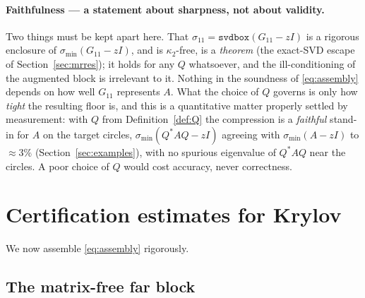 \documentclass[11pt]{article}
\newcommand{\sig}{\sigma}
\newcommand{\sigmin}{\sigma_{\min}}
\newcommand{\svdbox}{\texttt{svdbox}}
\begin{document}
\paragraph{Faithfulness --- a statement about sharpness, not about validity.} Two things must be kept
apart here. That $\sig_{11}=\svdbox(G_{11}-zI)$ is a rigorous enclosure of $\sigmin(G_{11}-zI)$, and is
$\kappa_2$-free, is a \emph{theorem} (the exact-SVD escape of Section~\ref{sec:mrres}); it holds for any
$Q$ whatsoever, and the ill-conditioning of the augmented block is irrelevant to it. Nothing in the
soundness of \eqref{eq:assembly} depends on how well $G_{11}$ represents $A$. What the choice of $Q$
governs is only how \emph{tight} the resulting floor is, and this is a quantitative matter properly
settled by measurement: with $Q$ from Definition~\ref{def:Q} the compression is a \emph{faithful}
stand-in for $A$ on the target circles, $\sigmin(Q^*AQ-zI)$ agreeing with $\sigmin(A-zI)$ to
$\approx3\%$ (Section~\ref{sec:examples}), with no spurious eigenvalue of $Q^*AQ$ near the circles. A
poor choice of $Q$ would cost accuracy, never correctness.

\section{Certification estimates for Krylov}\label{sec:krylovcert}

We now assemble \eqref{eq:assembly} rigorously.

\subsection{The matrix-free far block}\label{sec:farblock}
\end{document}
